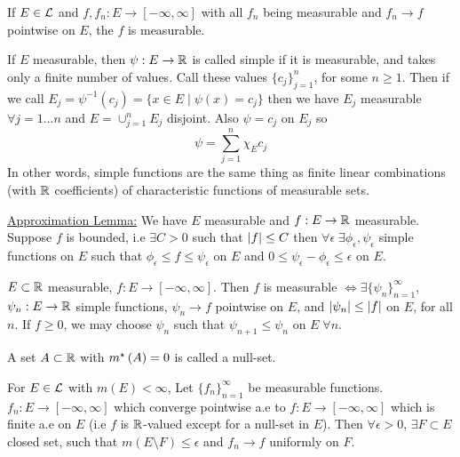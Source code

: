 \begin{prop}
    If $E \in \mathcal{L}$ and $f,f_n: E \rightarrow [-\infty, \infty]$ with all $f_n$ being measurable and $f_n \rightarrow f$ pointwise on $E$, the $f$ is measurable.
\end{prop}

\begin{definition}
    If $E$ measurable, then $\psi: E \rightarrow \mathbb{R}$ is called simple if it  is measurable, and takes only a finite number of values.
    Call these values $\{ c_j\}_{j=1}^{n}$, for some $n \geq 1$.
    Then if we call $E_j = \psi^{-1} (c_j) = \{ x \in E \mid \psi(x) = c_j \}$ then we have $E_j$ measurable $\forall j = 1 \hdots n$ and $E = \cup_{j=1}^{n} E_j$ disjoint.
    Also $\psi = c_j$ on $E_j$ so
    \[
        \boxed{\psi = \sum_{j=1}^{n} \chi_E c_j}
    \]
    In other words, simple functions are the same thing as finite linear combinations (with $\mathbb{R}$ coefficients) of characteristic functions of measurable sets.
\end{definition}

\underline{Approximation Lemma:} We have $E$ measurable and $f: E \rightarrow \mathbb{R}$ measurable.
Suppose $f$ is bounded, i.e $\exists C > 0$ such that $\lvert f\rvert \leq C$ then $\forall \epsilon \; \exists \phi_{\epsilon}, \psi_{\epsilon}$ simple functions on $E$ such that $\phi_{\epsilon} \leq f \leq \psi_{\epsilon}$  on $E$ and $0 \leq \psi_{\epsilon} - \phi_{\epsilon} \leq \epsilon$ on $E$.

\begin{prop}
    $E \subset \mathbb{R}$ measurable, $f: E \rightarrow [-\infty, \infty]$.
    Then $f$ is measurable $\iff \exists \{ \psi_n\}_{n=1}^{\infty}$, $\psi_{n}: E \rightarrow \mathbb{R}$ simple functions, $\psi_n \rightarrow f$ pointwise on $E$, and $\lvert\psi_n\rvert \leq \lvert f\rvert$ on $E$, for all $n$.
    If $f \geq 0$, we may choose $\psi_n$ such that $\psi_{n+1} \leq \psi_n$ on $E \; \forall n$.
\end{prop}

\begin{definition}
    A set $A \subset \mathbb{R}$ with $m^{\star}\left(A\right) = 0$ is called a null-set.
\end{definition}

\begin{theorem}
    For $E \in \mathcal{L}$ with $m(E) < \infty$, Let $\{ f_n \}_{n=1}^{\infty}$ be measurable functions.
    $f_n : E \rightarrow [-\infty, \infty]$ which converge pointwise a.e to $f: E \rightarrow [-\infty, \infty]$ which is finite a.e on $E$ (i.e $f$ is $\mathbb{R}$-valued except for a null-set in $E$).
    Then $\forall \epsilon > 0$, $\exists F \subset E$ closed set, such that $m(E \setminus F) \leq \epsilon$ and $f_n \rightarrow f$ uniformly on $F$.
\end{theorem}

